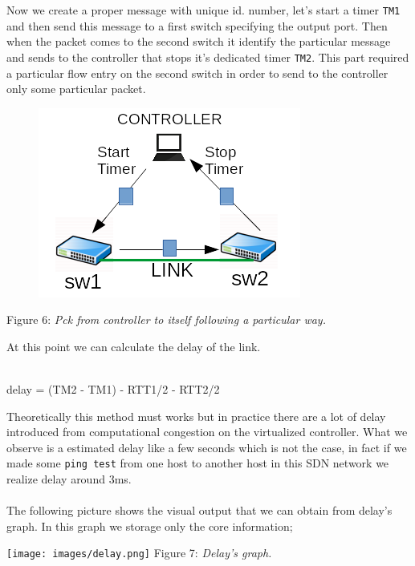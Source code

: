 \documentclass[article,10pt]{IEEEtran}
\begin{document}
Now we create a proper message with unique id. number, let's start a timer \texttt{TM1} and then send this message to a first switch specifying the output port.
Then when the packet comes to the second switch it identify the particular message and sends to the controller that stops it's dedicated timer \texttt{TM2}.
\newline This part required a particular flow entry on the second switch in order to send to the controller only some particular packet.
\begin{figure}[!h]
 \centering
 \includegraphics[scale=0.70]{images/rtt1.png}
 \label{fig:topo}
\end{figure}

\begin{center}
  {Figure 6: \emph{Pck from controller to itself following a particular way.}}
\end{center}

At this point we can calculate the delay of the link.
\\
\\
\begin{center}
  delay = (TM2 - TM1) - RTT1/2 - RTT2/2
\end{center}

Theoretically this method must works but in practice there are a lot of delay introduced from computational congestion on the virtualized controller.
What we observe is a estimated delay like a few seconds which is not the case, in fact if we made some \texttt{ping test} from one host to another host
in this SDN network we realize delay around 3ms.
\\
\\
The following picture shows the visual output that we can obtain from delay's graph. In this graph we storage only the core information;
\begin{center}
 \centering
 \texttt{[image: images/delay.png]}
 {Figure 7:\emph{ Delay's graph.}}
 \label{fig:topo}
\end{center}
\end{document}
